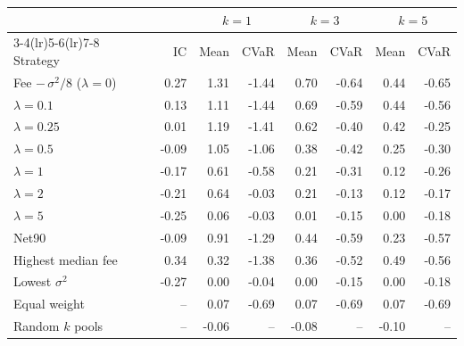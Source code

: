 \begin{tabular}{@{}lrrrrrrr@{}}
\toprule
 & & \multicolumn{2}{c}{$k=1$} & \multicolumn{2}{c}{$k=3$} & \multicolumn{2}{c}{$k=5$} \\ \cmidrule(lr){3-4}\cmidrule(lr){5-6}\cmidrule(lr){7-8}
Strategy & IC & Mean & CVaR & Mean & CVaR & Mean & CVaR \\
\midrule
Fee $-\,\sigma^2/8$ ($\lambda{=}0$) & 0.27 & 1.31 & -1.44 & 0.70 & -0.64 & 0.44 & -0.65 \\
\quad $\lambda=0.1$ & 0.13 & 1.11 & -1.44 & 0.69 & -0.59 & 0.44 & -0.56 \\
\quad $\lambda=0.25$ & 0.01 & 1.19 & -1.41 & 0.62 & -0.40 & 0.42 & -0.25 \\
\quad $\lambda=0.5$ & -0.09 & 1.05 & -1.06 & 0.38 & -0.42 & 0.25 & -0.30 \\
\quad $\lambda=1$ & -0.17 & 0.61 & -0.58 & 0.21 & -0.31 & 0.12 & -0.26 \\
\quad $\lambda=2$ & -0.21 & 0.64 & -0.03 & 0.21 & -0.13 & 0.12 & -0.17 \\
\quad $\lambda=5$ & -0.25 & 0.06 & -0.03 & 0.01 & -0.15 & 0.00 & -0.18 \\
Net90 & -0.09 & 0.91 & -1.29 & 0.44 & -0.59 & 0.23 & -0.57 \\
Highest median fee & 0.34 & 0.32 & -1.38 & 0.36 & -0.52 & 0.49 & -0.56 \\
Lowest $\sigma^2$ & -0.27 & 0.00 & -0.04 & 0.00 & -0.15 & 0.00 & -0.18 \\
Equal weight & -- & 0.07 & -0.69 & 0.07 & -0.69 & 0.07 & -0.69 \\
Random $k$ pools & -- & -0.06 & -- & -0.08 & -- & -0.10 & -- \\
\bottomrule
\end{tabular}
